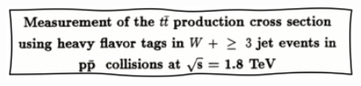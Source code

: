 \begin{columns}[T]
  \begin{column}{0.66\textwidth}
    
  \end{column}
  \begin{column}{0.33\textwidth}
    
    \vspace{0.2cm}
    \includegraphics[width=1.0\textwidth]{./figures/phd_title.png}    
      
  \end{column}
\end{columns}

\vspace{0.3cm}

